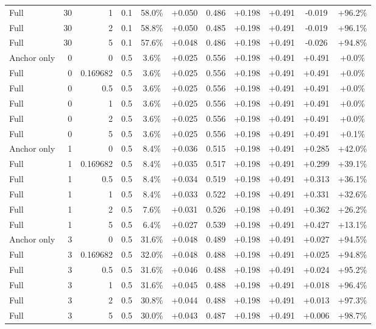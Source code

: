 \begin{table}[htbp]
\begin{tabular}{lrrrccccccc}
Full & 30 & 1 & 0.1 & 58.0\% & +0.050 & 0.486 & +0.198 & +0.491 & -0.019 & +96.2\% \\
Full & 30 & 2 & 0.1 & 58.8\% & +0.050 & 0.485 & +0.198 & +0.491 & -0.019 & +96.1\% \\
Full & 30 & 5 & 0.1 & 57.6\% & +0.048 & 0.486 & +0.198 & +0.491 & -0.026 & +94.8\% \\
Anchor only & 0 & 0 & 0.5 & 3.6\% & +0.025 & 0.556 & +0.198 & +0.491 & +0.491 & +0.0\% \\
Full & 0 & 0.169682 & 0.5 & 3.6\% & +0.025 & 0.556 & +0.198 & +0.491 & +0.491 & +0.0\% \\
Full & 0 & 0.5 & 0.5 & 3.6\% & +0.025 & 0.556 & +0.198 & +0.491 & +0.491 & +0.0\% \\
Full & 0 & 1 & 0.5 & 3.6\% & +0.025 & 0.556 & +0.198 & +0.491 & +0.491 & +0.0\% \\
Full & 0 & 2 & 0.5 & 3.6\% & +0.025 & 0.556 & +0.198 & +0.491 & +0.491 & +0.0\% \\
Full & 0 & 5 & 0.5 & 3.6\% & +0.025 & 0.556 & +0.198 & +0.491 & +0.491 & +0.1\% \\
Anchor only & 1 & 0 & 0.5 & 8.4\% & +0.036 & 0.515 & +0.198 & +0.491 & +0.285 & +42.0\% \\
Full & 1 & 0.169682 & 0.5 & 8.4\% & +0.035 & 0.517 & +0.198 & +0.491 & +0.299 & +39.1\% \\
Full & 1 & 0.5 & 0.5 & 8.4\% & +0.034 & 0.519 & +0.198 & +0.491 & +0.313 & +36.1\% \\
Full & 1 & 1 & 0.5 & 8.4\% & +0.033 & 0.522 & +0.198 & +0.491 & +0.331 & +32.6\% \\
Full & 1 & 2 & 0.5 & 7.6\% & +0.031 & 0.526 & +0.198 & +0.491 & +0.362 & +26.2\% \\
Full & 1 & 5 & 0.5 & 6.4\% & +0.027 & 0.539 & +0.198 & +0.491 & +0.427 & +13.1\% \\
Anchor only & 3 & 0 & 0.5 & 31.6\% & +0.048 & 0.489 & +0.198 & +0.491 & +0.027 & +94.5\% \\
Full & 3 & 0.169682 & 0.5 & 32.0\% & +0.048 & 0.488 & +0.198 & +0.491 & +0.025 & +94.8\% \\
Full & 3 & 0.5 & 0.5 & 31.6\% & +0.046 & 0.488 & +0.198 & +0.491 & +0.024 & +95.2\% \\
Full & 3 & 1 & 0.5 & 31.6\% & +0.045 & 0.488 & +0.198 & +0.491 & +0.018 & +96.4\% \\
Full & 3 & 2 & 0.5 & 30.8\% & +0.044 & 0.488 & +0.198 & +0.491 & +0.013 & +97.3\% \\
Full & 3 & 5 & 0.5 & 30.0\% & +0.043 & 0.487 & +0.198 & +0.491 & +0.006 & +98.7\% \\

\end{tabular}
\end{table}
